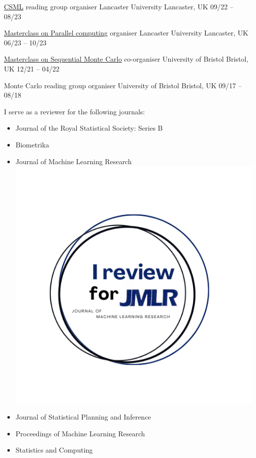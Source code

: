 

\begin{cvhonors}

	
    \cvhonor
    {\href{https://lu-csml.github.io/}{CSML} reading group organiser}
	{Lancaster University} 
	{Lancaster, UK}
	{09\slash 22 -- 08\slash23}
	
    \cvhonor
    {\href{https://www.lancaster.ac.uk/bayes-for-health/news/masterclass-in-parallel-computing}{Masterclass on Parallel computing} organiser}
	{Lancaster University} 
	{Lancaster, UK}
	{06\slash 23 -- 10\slash 23}
	
    \cvhonor
    {\href{https://www.lancaster.ac.uk/bayes-for-health/news/joine-bayes4health-and-cosines-masterclass}{Masterclass on Sequential Monte Carlo} co-organiser}
	{University of Bristol} 
	{Bristol, UK}
	{12\slash 21 -- 04\slash 22}
	
    \cvhonor
    {Monte Carlo reading group organiser}
	{University of Bristol} 
	{Bristol, UK}
	{09\slash 17 -- 08\slash 18}

\end{cvhonors}

\begin{small} \color{black}

I serve as a reviewer for the following journals:
\vspace{-0.125cm}
\begin{itemize}
    \item Journal of the Royal Statistical Society: Series B
    \item Biometrika
    \item Journal of Machine Learning Research \includegraphics[width=.125in]{cv/figure/JMLR.png}
    \item Journal of Statistical Planning and Inference
    \item Proceedings of Machine Learning Research
    \item Statistics and Computing
\end{itemize}
\end{small}

